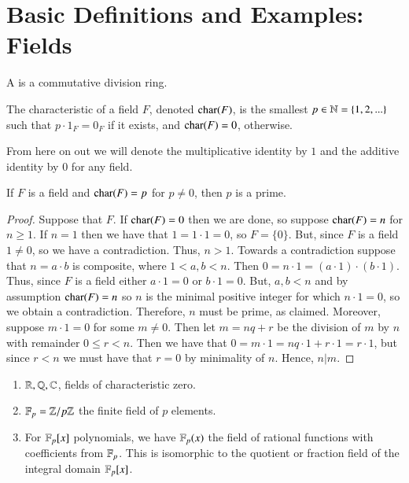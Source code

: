 \chapter{\textsection\textsection Basic Definitions and Examples: Fields}



\begin{defn}
    A  is a commutative division ring.
\end{defn}


\begin{defn}
    The characteristic of a field $F$, denoted $\operatorname{char}(F)$, is the smallest $p \in \mathbb N = \{1,2,...\}$ such that $p\cdot 1_F = 0_F$ if it exists, and $\operatorname{char}(F) = 0$, otherwise.
\end{defn}

From here on out we will denote the multiplicative identity by $1$ and the additive identity by $0$ for any field.

\begin{rmk}
    If $F$ is a field and $\operatorname{char}(F) = p$ for $p \neq 0$, then $p$ is a prime.
\end{rmk}
\begin{proof}
    Suppose that $F$. If $\operatorname{char}(F) = 0$ then we are done, so suppose $\operatorname{char}(F) = n$ for $n \geq 1$. If $n = 1$ then we have that $1 = 1\cdot 1 = 0$, so $F = \{0\}$. But, since $F$ is a field $1 \neq 0$, so we have a contradiction. Thus, $n > 1$. Towards a contradiction suppose that $n = a\cdot b$ is composite, where $1 < a,b < n$. Then $0 = n\cdot 1 = (a\cdot 1)\cdot (b\cdot 1)$. Thus, since $F$ is a field either $a\cdot 1 = 0$ or $b \cdot 1 = 0$. But, $a,b < n$ and by assumption $\operatorname{char}(F) = n$ so $n$ is the minimal positive integer for which $n\cdot 1 = 0$, so we obtain a contradiction. Therefore, $n$ must be prime, as claimed. Moreover, suppose $m \cdot 1 = 0$ for some $m \neq 0$. Then let $m = nq + r$ be the division of $m$ by $n$ with remainder $0\leq r<n$. Then we have that $0 = m\cdot 1 = nq\cdot 1 + r\cdot 1 = r\cdot 1$, but since $r < n$ we must have that $r = 0$ by minimality of $n$. Hence, $n \vert m$.
\end{proof}

\begin{eg}
    \leavevmode
    \begin{enumerate}
        \item $\mathbb R, \mathbb Q, \mathbb C$, fields of characteristic zero.
        \item $\mathbb F_p = \mathbb Z/p\mathbb Z$ the finite field of $p$ elements.
        \item For $\mathbb F_p[x]$ polynomials, we have $\mathbb F_p(x)$ the field of rational functions with coefficients from $\mathbb F_p$. This is isomorphic to the quotient or fraction field of the integral domain $\mathbb F_p[x]$.
    \end{enumerate}
\end{eg}

